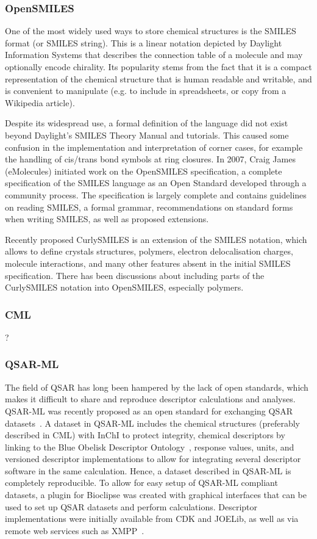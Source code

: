 \documentclass[10pt]{bmc_article}
\newenvironment{bmcformat}{\fussy\setboolean{publ}{true}}{\fussy}
\begin{document}
\begin{bmcformat}
    \subsubsection*{OpenSMILES}

One of the most widely used ways to store chemical structures is the
SMILES format (or SMILES string). This is a linear notation depicted
by Daylight Information Systems that describes the connection table
of a molecule and may optionally encode chirality. Its popularity
stems from the fact that it is a compact representation of the
chemical structure that is human readable and writable, and is
convenient to manipulate (e.g. to include in spreadsheets, or copy
from a Wikipedia article).

Despite its widespread use, a formal
definition of the language did not exist beyond Daylight's SMILES
Theory Manual and tutorials. This caused some confusion in the
implementation and interpretation of corner cases, for example the
handling of cis/trans bond symbols at ring closures. In 2007, Craig
James (eMolecules) initiated work on the OpenSMILES specification, a
complete specification of the SMILES language as an Open Standard
developed through a community process. The specification is largely
complete and contains guidelines on reading SMILES, a formal
grammar, recommendations on standard forms when writing SMILES, as
well as proposed extensions.

Recently proposed CurlySMILES\cite{CurlySMILES} is an extension of the
SMILES notation, which allows to define crystals structures, polymers,
electron delocalisation charges, molecule interactions, and many other
features absent in the initial SMILES specification. There has been
discussions about including parts of the CurlySMILES notation into
OpenSMILES, especially polymers.

\subsubsection*{CML}
?


\subsubsection*{QSAR-ML}
The field of QSAR has long been hampered by the lack of open standards, which makes it difficult to share and reproduce descriptor calculations and analyses. QSAR-ML was recently proposed as an open standard for exchanging QSAR datasets~\cite{Spjuth:2010uq}. A dataset in QSAR-ML includes the chemical structures (preferably described in CML) with InChI to protect integrity, chemical descriptors by linking to the Blue Obelisk Descriptor Ontology~\cite{bodo}, response values, units, and versioned descriptor implementations to allow for integrating several descriptor software in the same calculation. Hence, a dataset described in QSAR-ML is completely reproducible. To allow for easy setup of QSAR-ML compliant datasets, a plugin for Bioclipse was created with graphical interfaces that can be used to set up QSAR datasets and perform calculations. Descriptor implementations were initially available from CDK and JOELib, as well as via remote web services such as XMPP~\cite{Wagener:2009uq}.



\end{bmcformat}
\end{document}
